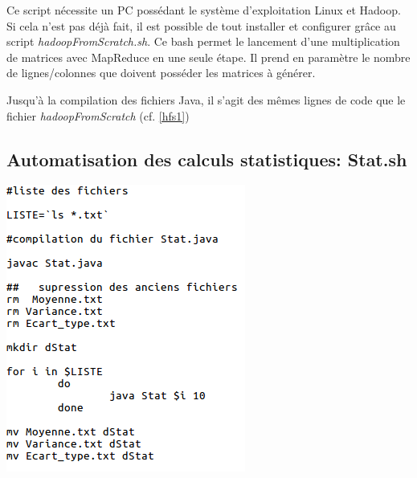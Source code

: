 \documentclass[a4paper, 11pt]{article}
\begin{document}
Ce script nécessite un PC possédant le système d'exploitation Linux et Hadoop. Si cela n'est pas déjà fait, il est possible de tout installer et configurer grâce au script \textit{hadoopFromScratch.sh}. Ce bash permet le lancement d'une multiplication de matrices avec MapReduce en une seule étape. Il prend en paramètre le nombre de lignes/colonnes que doivent posséder les matrices à générer.

Jusqu'à la compilation des fichiers Java, il s'agit des mêmes lignes de code que le fichier \textit{hadoopFromScratch} (cf. \ref{hfs1})
\clearpage
    
    \subsection{Automatisation des calculs statistiques: Stat.sh}
    \vspace{2\baselineskip}
    \label{Stat.sh}
  	\begin{center}
        \includegraphics[scale=0.8, angle=0]{./img/scriptStat.png}
    \end{center}
\clearpage
\end{document}
